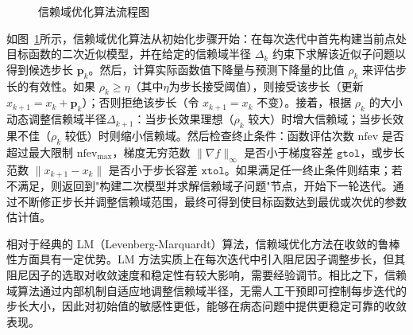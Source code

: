\begin{figure}[htbp]
	\caption{信赖域优化算法流程图}
	\label{fig:TRO_flowchart}
\end{figure}


如图~\ref{fig:TRO_flowchart}所示，信赖域优化算法从初始化步骤开始：在每次迭代中首先构建当前点处目标函数的二次近似模型，并在给定的信赖域半径 $\Delta_k$ 约束下求解该近似子问题以得到候选步长 $\mathbf{p}_k$。然后，计算实际函数值下降量与预测下降量的比值 $\rho_k$ 来评估步长的有效性。如果 $\rho_k \ge \eta$（其中$\eta$为步长接受阈值），则接受该步长（更新 $x_{k+1} = x_k + \mathbf{p}_k$）；否则拒绝该步长（令 $x_{k+1} = x_k$ 不变）。接着，根据 $\rho_k$ 的大小动态调整信赖域半径$\Delta_{k+1}$：当步长效果理想（$\rho_k$ 较大）时增大信赖域；当步长效果不佳（$\rho_k$ 较低）时则缩小信赖域。然后检查终止条件：函数评估次数 $\mathrm{nfev}$ 是否超过最大限制 $\mathrm{nfev_{max}}$，梯度无穷范数 $\|\nabla f\|_\infty$ 是否小于梯度容差 $\texttt{gtol}$，或步长范数 $\|x_{k+1} - x_k\|$ 是否小于步长容差 $\texttt{xtol}$。如果满足任一终止条件则结束；若不满足，则返回到"构建二次模型并求解信赖域子问题"节点，开始下一轮迭代。通过不断修正步长并调整信赖域范围，最终可得到使目标函数达到最优或次优的参数估计值。


相对于经典的 LM（Levenberg-Marquardt）算法，信赖域优化方法在收敛的鲁棒性方面具有一定优势。LM 方法实质上在每次迭代中引入阻尼因子调整步长，但其阻尼因子的选取对收敛速度和稳定性有较大影响，需要经验调节。相比之下，信赖域算法通过内部机制自适应地调整信赖域半径，无需人工干预即可控制每步迭代的步长大小，因此对初始值的敏感性更低，能够在病态问题中提供更稳定可靠的收敛表现。

